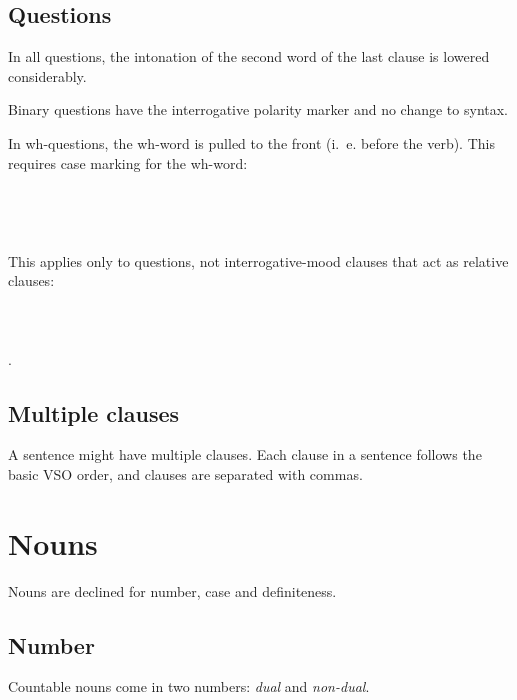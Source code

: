 \documentclass{book}
\begin{document}
\section{Questions}

In all questions, the intonation of the second word of the last clause is lowered considerably.

Binary questions have the interrogative polarity marker and no change to syntax.

In wh-questions, the wh-word is pulled to the front (i.~e. before the verb). This requires case marking for the wh-word: \\
~\\
 \\
   \\
    \\

This applies only to questions, not interrogative-mood clauses that act as relative clauses: \\
~\\
 \\
     \\
    .

\section{Multiple clauses}

A sentence might have multiple clauses. Each clause in a sentence follows the basic VSO order, and clauses are separated with commas.

\chapter{Nouns}

Nouns are declined for number, case and definiteness.

\section{Number}

Countable nouns come in two numbers: \emph{dual} and \emph{non-dual}.
\end{document}
